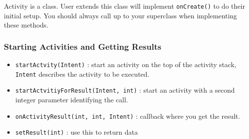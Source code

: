 Activity is a class. User extends this class will implement \texttt{onCreate()}
to do their initial setup. You should always call up to your superclass when
implementing these methods.


\subsubsection{Starting Activities and Getting Results}

\begin{itemize}
\item 
  \texttt{startActvity(Intent)} : start an activity on the top of the activity
  stack, \texttt{Intent} describes the activity to be executed.
\item
  \texttt{startActvitiyForResult(Intent, int)} : start an activity with a second
  integer parameter identifying the call.
\item 
  \texttt{onActivityResult(int, int, Intent)} : callback where you get the result.
\item 
  \texttt{setResult(int)} : use this to return data
\end{itemize}

  
  





